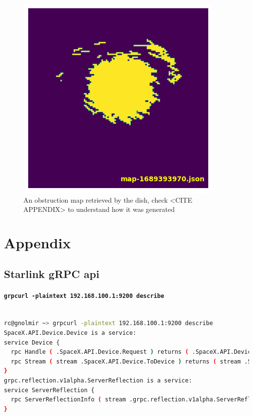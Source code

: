 \documentclass[IN,11pt,twoside,openright,bachelor,english]{tumthesis}
\begin{document}
\begin{figure}
	\centering
	\includegraphics[]{img/obstruction_map_finale.png}
	\caption{An obstruction map retrieved by the dish, check <CITE APPENDIX> to understand how it was generated}
\end{figure}



\appendix
\chapter{Appendix}
\label{chap:appendix}


\section{Starlink gRPC api}
\label{starlink-grpc}

\subsubsection{\texttt{grpcurl -plaintext 192.168.100.1:9200 describe}}

\begin{lstlisting}[language=bash,basicstyle=\tiny]

rc@gnolmir ~> grpcurl -plaintext 192.168.100.1:9200 describe
SpaceX.API.Device.Device is a service:
service Device {
  rpc Handle ( .SpaceX.API.Device.Request ) returns ( .SpaceX.API.Device.Response );
  rpc Stream ( stream .SpaceX.API.Device.ToDevice ) returns ( stream .SpaceX.API.Device.FromDevice );
}
grpc.reflection.v1alpha.ServerReflection is a service:
service ServerReflection {
  rpc ServerReflectionInfo ( stream .grpc.reflection.v1alpha.ServerReflectionRequest ) returns ( stream .grpc.reflection.v1alpha.ServerReflectionResponse );
}
\end{lstlisting}
\end{document}
